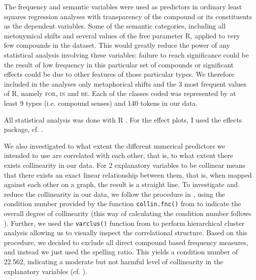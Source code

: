 The frequency and semantic variables were used as predictors in
ordinary least squares regression analyses with transparency of the
compound or its constituents as the dependent variables. 
Some
of the semantic categories, including all metonymical shifts and
several values of the free parameter R, applied to very few compounds in the
dataset. This would greatly reduce the power of any statistical
analysis involving these variables: failure to reach significance
could be the result of low frequency in this particular set of
compounds or significant effects could be due to other features of
those particular types. We therefore included in the analyses only
metaphorical shifts and the 3 most frequent values of R, namely
\textsc{for, in} and \textsc{be}. Each of the classes coded was
represented by at least 9 types (i.e. compound senses) and 140 tokens
in our data. %

All statistical analysis was done with R \citep{Rbase}. For the effect plots, I used the effects package, cf. \citet{effects}. 

We also investigated to what extent the
different numerical predictors we intended to use are correlated with
each other, that is, to what extent there exists collinearity in our
data. For 2 explanatory variables to be collinear means that there
exists an exact linear relationship between them, that is, when mapped
against each other on a graph, the result is a straight line. To
investigate and reduce the collinearity in our data, we follow the
procedure in \citet[181--183]{Baayen:2008a}, using the condition number
provided by the function \texttt{collin.fnc()} from \citet{languageR} to
indicate the overall degree of collinearity (this way of calculating
the condition number follows \citealt{Belsleyetal:1980}). 
 Further, we
used the \texttt{varclus()}
function from \citet{Hmisc} to perform hierarchical cluster analysis
allowing us to visually inspect the correlational structure.
Based on this procedure, we decided to exclude all direct compound
based frequency measures, and instead we just used the spelling ratio. 
This yields a condition number of 22.562, %
indicating a moderate but
not harmful level of collinearity in the explanatory variables (cf. \citealt[182]{Baayen:2008a}). 


